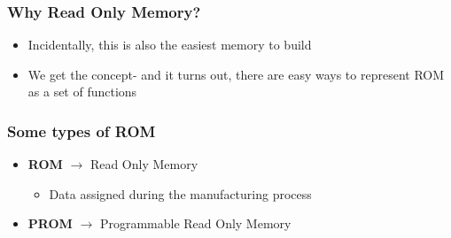 \documentclass{beamer}
\begin{document}
             \begin{frame}
             	\frametitle{Why Read Only Memory?}
             	\begin{itemize}
             		\item Incidentally, this is also the easiest memory to build 
             		\item We get the concept- and it turns out, there are easy ways to represent ROM as a set of functions
             	\end{itemize}
             \end{frame}
             
             \begin{frame}
             	\frametitle{Some types of ROM}
             	\begin{itemize}
             		\item \textbf{ROM} $\rightarrow$ Read Only Memory
             		\begin{itemize}
             			\item Data assigned during the manufacturing process
             		\end{itemize}
             		\item \textbf{PROM} $\rightarrow$ Programmable Read Only Memory
             	\end{itemize}
             \end{frame}
             
             
             
   
   		
    
\end{document}
